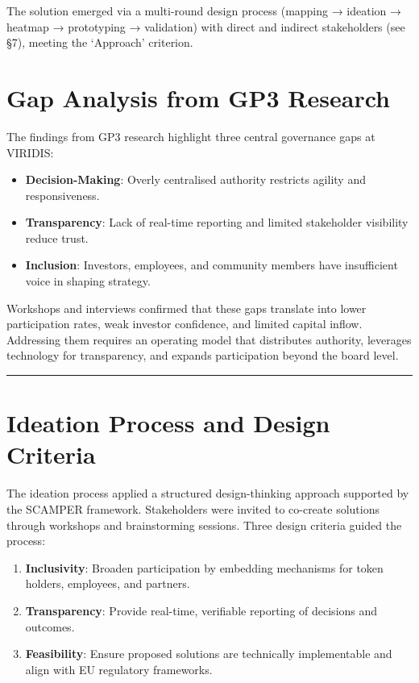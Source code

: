 \documentclass[
  english,
  12pt,
  oneside,
  open=any]{scrbook}
\providecommand{\tightlist}{%
  \setlength{\itemsep}{0pt}\setlength{\parskip}{0pt}}\usepackage{longtable,booktabs,array}
\begin{document}
The solution emerged via a multi-round design process (mapping →
ideation → heatmap → prototyping → validation) with direct and indirect
stakeholders (see §7), meeting the `Approach' criterion.

\section{Gap Analysis from GP3 Research}\label{sec-gap-res}

The findings from GP3 research highlight three central governance gaps
at VIRIDIS:

\begin{itemize}
\tightlist
\item
  \textbf{Decision-Making}: Overly centralised authority restricts
  agility and responsiveness.\\
\item
  \textbf{Transparency}: Lack of real-time reporting and limited
  stakeholder visibility reduce trust.\\
\item
  \textbf{Inclusion}: Investors, employees, and community members have
  insufficient voice in shaping strategy.
\end{itemize}

Workshops and interviews confirmed that these gaps translate into lower
participation rates, weak investor confidence, and limited capital
inflow. Addressing them requires an operating model that distributes
authority, leverages technology for transparency, and expands
participation beyond the board level.

\begin{center}\rule{0.5\linewidth}{0.5pt}\end{center}

\section{Ideation Process and Design Criteria}\label{sec-ideation}

The ideation process applied a structured design-thinking approach
supported by the SCAMPER framework. Stakeholders were invited to
co-create solutions through workshops and brainstorming sessions. Three
design criteria guided the process:

\begin{enumerate}
\def\labelenumi{\arabic{enumi}.}
\tightlist
\item
  \textbf{Inclusivity}: Broaden participation by embedding mechanisms
  for token holders, employees, and partners.\\
\item
  \textbf{Transparency}: Provide real-time, verifiable reporting of
  decisions and outcomes.\\
\item
  \textbf{Feasibility}: Ensure proposed solutions are technically
  implementable and align with EU regulatory frameworks.
\end{enumerate}
\end{document}
